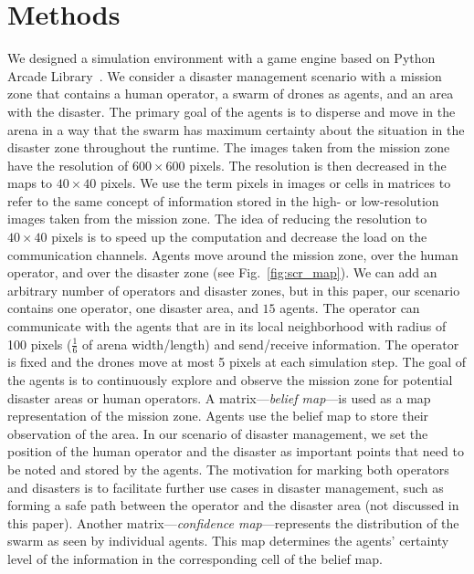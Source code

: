 \documentclass[runningheads]{llncs}%
\begin{document}
\section{Methods}
\label{sec:methods}
We designed a simulation environment with a game engine based on Python Arcade Library~\cite{arcade}. We consider a disaster management scenario with a mission zone that contains a human operator, a swarm of drones as agents, and an area with the disaster. The primary goal of the agents is to disperse and move in the arena in a way that the swarm has maximum certainty about the situation in the disaster zone throughout the runtime. The images taken from the mission zone have the resolution of $600 \times 600 $ pixels. The resolution is then decreased in the maps to $40 \times 40$ pixels. We use the term pixels in images or cells in matrices to refer to the same concept of information stored in the high- or low-resolution images taken from the mission zone. The idea of reducing the resolution to $40 \times 40$ pixels is to speed up the computation and decrease the load on the communication channels. 
Agents move around the mission zone, over the human operator, and over the disaster zone (see Fig.~\ref{fig:scr_map}). We can add an arbitrary number of operators and disaster zones, but in this paper, our scenario contains one operator, one disaster area, and $15$ agents. The operator can communicate with the agents that are in its local neighborhood with radius of 100 pixels ($\frac{1}{6}$ of arena width/length) and send/receive information. The operator is fixed and the drones move at most {5 pixels} at each simulation step. The goal of the agents is to continuously explore and observe the mission zone for potential disaster areas or human operators. A matrix---\textit{belief map}---is used as a map representation of the mission zone. Agents use the belief map to store their observation of the area. In our scenario of disaster management, we set the position of the human operator and the disaster as important points that need to be noted and stored by the agents. %
The motivation for marking both operators and disasters is to facilitate further use cases in disaster management, such as forming a safe path between the operator and the disaster area (not discussed in this paper). {Another matrix---\textit{confidence map}---represents the distribution of the swarm as seen by individual agents.} This map determines the agents' certainty level of the information in the corresponding cell of the belief map. 
\end{document}
